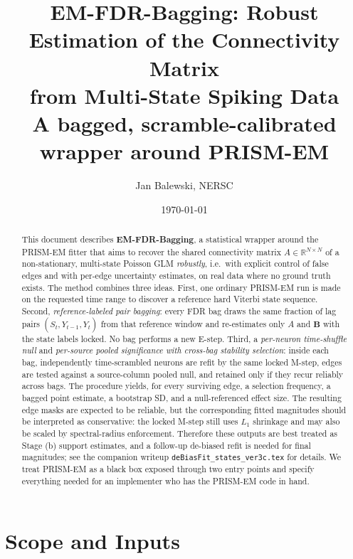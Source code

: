 \documentclass[11pt]{article}
\title{EM-FDR-Bagging: Robust Estimation of the Connectivity Matrix\\
from Multi-State Spiking Data\\
\large A bagged, scramble-calibrated wrapper around PRISM-EM}
\author{Jan Balewski, NERSC}
\date{\today}
\begin{document}
\maketitle

\begin{abstract}
This document describes \textbf{EM-FDR-Bagging}, a statistical wrapper around
the PRISM-EM fitter that aims to recover the shared connectivity matrix
\(A\in\mathbb{R}^{N\times N}\) of a non-stationary, multi-state Poisson GLM
\emph{robustly}, i.e.\ with explicit control of false edges and with
per-edge uncertainty estimates, on real data where no ground truth exists.
The method combines three ideas. First, one ordinary PRISM-EM run is made on
the requested time range to discover a reference hard Viterbi state sequence.
Second, \emph{reference-labeled pair bagging}: every FDR bag draws the same
fraction of lag pairs \((\hat S_t,Y_{t-1},Y_t)\) from that reference window
and re-estimates only \(A\) and \(\mathbf B\) with the state labels locked.
No bag performs a new E-step. Third, a \emph{per-neuron time-shuffle null}
and \emph{per-source pooled significance with cross-bag stability selection}:
inside each bag, independently time-scrambled neurons are refit by the same
locked M-step, edges are tested against a source-column pooled null, and retained only
if they recur reliably across bags. The procedure yields, for every
surviving edge, a selection frequency, a bagged point estimate, a bootstrap
SD, and a null-referenced effect size. The resulting edge masks are expected
to be reliable, but the corresponding fitted magnitudes should be interpreted
as conservative: the locked M-step still uses \(L_1\) shrinkage and may also
be scaled by spectral-radius enforcement. Therefore these outputs are best
treated as Stage (b) support estimates, and a follow-up de-biased refit is
needed for final magnitudes; see the companion writeup
\texttt{deBiasFit\_states\_ver3c.tex} for details. We treat PRISM-EM as a
black box exposed through two entry points and specify everything needed for
an implementer who has the PRISM-EM code in hand.
\end{abstract}

\tableofcontents
\newpage

\section{Scope and Inputs}
\end{document}
